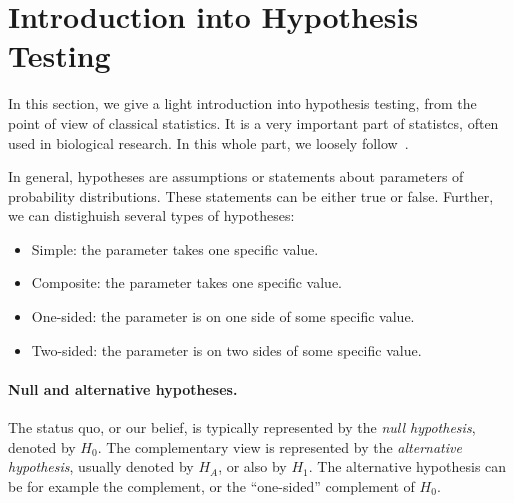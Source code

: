 



\section{Introduction into Hypothesis Testing}
\label{pvalue}
In this section, we give a light introduction into hypothesis testing, from the point of view of classical statistics.
It is a very important part of statistcs, often used in biological research.
In this whole part, we loosely follow~\cite{citacia}.

In general, hypotheses are assumptions or statements about parameters of probability distributions.
These statements can be either true or false.
Further, we can distighuish several types of hypotheses:
\begin{itemize}
\item
Simple: the parameter takes one specific value. %
\item
Composite: the parameter takes one specific value. %
\item
One-sided: the parameter is on one side of some specific value. %
\item
Two-sided: the parameter is on two sides of some specific value. %
\end{itemize}

\paragraph{Null and alternative hypotheses.}
The status quo, or our belief, is typically represented by the \emph{null hypothesis}, denoted by $H_0$.
The complementary view is represented by the \emph{alternative hypothesis}, usually denoted by $H_A$, or also by $H_1$.
The alternative hypothesis can be for example the complement, or the ``one-sided'' complement of $H_0$.

